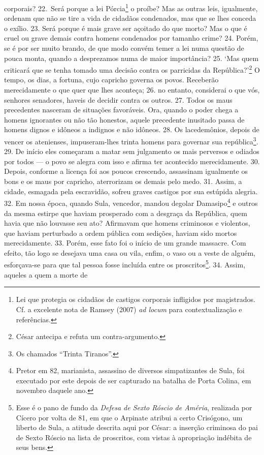 corporais? 22.~Será porque a lei Pórcia\footnote{Lei  que protegia os cidadãos
de castigos corporais infligidos por magistrados. Cf. a excelente nota de
Ramsey (2007) \emph{ad locum} para contextualização e referências.} o proíbe?
Mas as outras leis, igualmente, ordenam que não se tire a vida de cidadãos
condenados, mas que se lhes conceda o exílio. 23. Será porque é mais grave ser
açoitado do que morto? Mas o que é cruel ou grave demais contra homens
condenados por tamanho crime? 24. Porém, se é por ser muito brando, de que modo
convém temer a lei numa questão de pouca monta, quando a desprezamos numa de
maior importância? 25. `Mas quem criticará que se tenha tomado uma decisão
contra os parricidas da República?'\footnote{César antecipa e refuta um
contra-argumento.} O tempo, os dias, a fortuna, cujo capricho governa os povos.
Receberão merecidamente o que quer que lhes aconteça; 26. no entanto,
considerai o que vós, senhores senadores, haveis de decidir contra os outros.
27. Todos os maus precedentes nasceram de situações favoráveis. Ora, quando o poder
chega a homens ignorantes ou não tão honestos, aquele precedente inusitado passa de
homens dignos e idôneos a indignos e não idôneos. 28. Os lacedemônios, depois
de vencer os atenienses, impuseram-lhes trinta homens para governar sua
república\footnote{Os chamados ``Trinta Tiranos''.}. 29. De início eles
começaram a matar sem julgamento os mais perversos e odiados por todos --- o povo
se alegra com isso e afirma ter acontecido merecidamente. 30. Depois, conforme
a licença foi aos poucos crescendo, assassinam igualmente os bons e os maus por
capricho, aterrorizam os demais pelo medo. 31. Assim, a cidade, esmagada pela
escravidão, sofreu graves castigos por sua estúpida alegria. 32. Em nossa
época, quando Sula, vencedor, mandou degolar Damasipo\footnote{Pretor em 82,
marianista, assassino de diversos simpatizantes de Sula, foi executado por este
depois de ser capturado na batalha de Porta Colina, em novembro daquele ano.} e
outros da mesma estirpe que haviam prosperado com a desgraça da República, quem
havia que não louvasse seu ato? Afirmavam que homens criminosos e violentos,
que haviam perturbado a ordem pública com sedições, haviam sido mortos
merecidamente. 33. Porém, esse fato foi o início de um grande massacre. Com
efeito, tão logo se desejava uma casa ou vila, enfim, o vaso ou a veste de
alguém, esforçava-se para que tal pessoa fosse incluída entre os
proscritos\footnote{Esse é o pano de fundo da \emph{Defesa de Sexto Róscio de
Améria}, realizada por Cícero por volta de 81, em que o Arpinate atribui a certo
Crisógono, um liberto de Sula, a atitude descrita aqui por César: a inserção
criminosa do pai de Sexto Róscio na lista de proscritos, com vistas à
apropriação indébita de seus bens.}. 34. Assim, aqueles a quem a morte de

